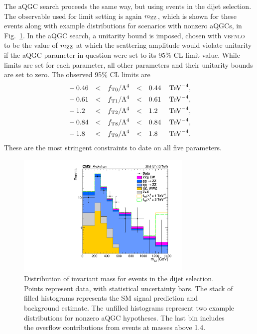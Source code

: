The aQGC search proceeds the same way, but using events in the dijet selection.
The observable used for limit setting is again $m_{\mathrm{Z}\mathrm{Z}}$, which is shown for these events along with example distributions for scenarios with nonzero aQGCs, in Fig.~\ref{fig:aQGC}.
In the aQGC search, a unitarity bound is imposed, chosen with \textsc{vbfnlo}~\cite{Arnold:2008rz} to be the value of $m_{\mathrm{Z}\mathrm{Z}}$ at which the scattering amplitude would violate unitarity if the aQGC parameter in question were set to its 95\% CL limit value.
While limits are set for each parameter, all other parameters and their unitarity bounds are set to zero.
The observed 95\% CL limits are
\begin{equation}\label{eq:aQGC1D}
  \begin{aligned}
    &-0.46  &<& \quad  f_\text{T0} / \Lambda^4  &<&  \quad  0.44  & \,\mathrm{Te\hspace{-.08em}V}^{-4}, \\
    &-0.61  &<& \quad  f_\text{T1} / \Lambda^4  &<&  \quad  0.61  & \,\mathrm{Te\hspace{-.08em}V}^{-4}, \\
    &-1.2   &<& \quad  f_\text{T2} / \Lambda^4  &<&  \quad  1.2   & \,\mathrm{Te\hspace{-.08em}V}^{-4}, \\
    &-0.84  &<& \quad  f_\text{T8} / \Lambda^4  &<&  \quad  0.84  & \,\mathrm{Te\hspace{-.08em}V}^{-4}, \\
    &-1.8   &<& \quad  f_\text{T9} / \Lambda^4  &<&  \quad  1.8   & \,\mathrm{Te\hspace{-.08em}V}^{-4}.
  \end{aligned}
\end{equation}
These are the most stringent constraints to date on all five parameters.


\begin{figure}[htbp]
  \begin{center}
    \includegraphics[width=0.75\textwidth]{results/zzMass_aQGC.pdf}
    \caption[{\ZZ} invariant mass distribution for dijet events, with example aQGC working points]{
        Distribution of {\ZZ} invariant mass for events in the dijet selection.
        Points represent data, with statistical uncertainty bars.
        The stack of filled histograms represents the SM signal prediction and background estimate.
        The unfilled histograms represent two example {\MGAMC} distributions for nonzero aQGC hypotheses.
        The last bin includes the overflow contributions from events at masses above {1.4\TeV}.
      }\label{fig:aQGC}
  \end{center}
\end{figure}
